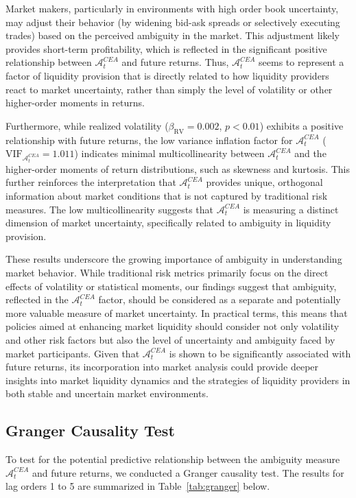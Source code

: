 \documentclass[preprint,12pt,authoryear]{elsarticle}
\begin{document}
Market makers, particularly in environments with high order book uncertainty, may adjust their behavior (by widening bid-ask spreads or selectively executing trades) based on the perceived ambiguity in the market. This adjustment likely provides short-term profitability, which is reflected in the significant positive relationship between $\mathcal{A}^{CEA}_t$ and future returns. Thus, $\mathcal{A}^{CEA}_t$ seems to represent a factor of liquidity provision that is directly related to how liquidity providers react to market uncertainty, rather than simply the level of volatility or other higher-order moments in returns.

Furthermore, while realized volatility (\(\beta_{\mathrm{RV}} = 0.002\), \(p < 0.01\)) exhibits a positive relationship with future returns, the low variance inflation factor for $\mathcal{A}^{CEA}_t$ (\(\mathrm{VIF}_{\mathcal{A}^{CEA}_t} = 1.011\)) indicates minimal multicollinearity between $\mathcal{A}^{CEA}_t$ and the higher-order moments of return distributions, such as skewness and kurtosis. This further reinforces the interpretation that $\mathcal{A}^{CEA}_t$ provides unique, orthogonal information about market conditions that is not captured by traditional risk measures. The low multicollinearity suggests that $\mathcal{A}^{CEA}_t$ is measuring a distinct dimension of market uncertainty, specifically related to ambiguity in liquidity provision.

These results underscore the growing importance of ambiguity in understanding market behavior. While traditional risk metrics primarily focus on the direct effects of volatility or statistical moments, our findings suggest that ambiguity, reflected in the $\mathcal{A}^{CEA}_t$ factor, should be considered as a separate and potentially more valuable measure of market uncertainty. In practical terms, this means that policies aimed at enhancing market liquidity should consider not only volatility and other risk factors but also the level of uncertainty and ambiguity faced by market participants. Given that $\mathcal{A}^{CEA}_t$ is shown to be significantly associated with future returns, its incorporation into market analysis could provide deeper insights into market liquidity dynamics and the strategies of liquidity providers in both stable and uncertain market environments.

\subsection{Granger Causality Test}
To test for the potential predictive relationship between the ambiguity measure $ \mathcal{A}^{CEA}_t $ and future returns, we conducted a Granger causality test. The results for lag orders 1 to 5 are summarized in Table~\ref{tab:granger} below.
\end{document}
